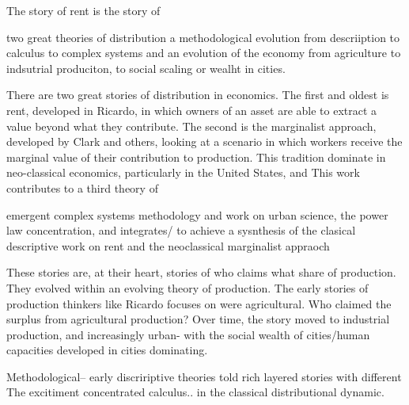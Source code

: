 
The story of rent is the story of 

two great theories of distribution
a methodological evolution from descriiption to calculus to complex systems and an evolution of the economy 
from agriculture to indsutrial produciton, to social scaling or wealht in cities. 



There are two great stories of distribution in economics. The first and oldest is rent, %
developed in Ricardo, in which owners of an asset are able to extract a value beyond what they contribute. 
The second is the marginalist approach, developed by Clark and others, looking at a scenario in which workers receive the marginal value of their contribution to production. This tradition dominate in neo-classical economics, particularly in the United States, and %
This work contributes to a third theory of 

emergent complex systems methodology and  work on urban science, the power law concentration, and integrates/ to achieve a sysnthesis of  the clasical descriptive work on rent and the neoclassical marginalist appraoch

These stories are, at their heart, stories of who claims what share of production. They evolved within an evolving theory of production. The early stories of production thinkers like Ricardo focuses on were agricultural. Who claimed the surplus from agricultural production? Over time, the story moved to industrial production, and increasingly urban- with the social wealth of cities/human capacities developed in cities dominating. %



Methodological-- early discririptive theories told rich layered stories with different
The excitiment concentrated  calculus.. in the classical distributional dynamic.

